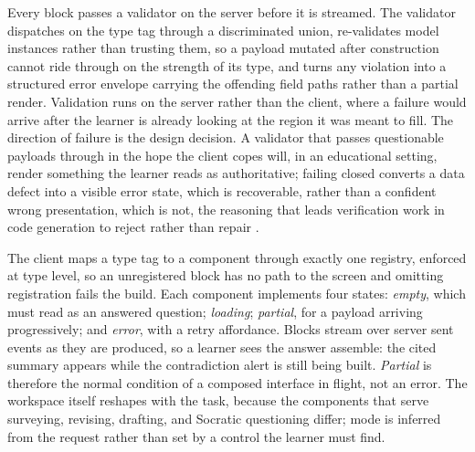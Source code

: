 \documentclass[conference]{IEEEtran}
\begin{document}
Every block passes a validator on the server before it is streamed. The validator dispatches on the type tag through a discriminated union, re-validates model instances rather than trusting them, so a payload mutated after construction cannot ride through on the strength of its type, and turns any violation into a structured error envelope carrying the offending field paths rather than a partial render. Validation runs on the server rather than the client, where a failure would arrive after the learner is already looking at the region it was meant to fill. The direction of failure is the design decision. A validator that passes questionable payloads through in the hope the client copes will, in an educational setting, render something the learner reads as authoritative; failing closed converts a data defect into a visible error state, which is recoverable, rather than a confident wrong presentation, which is not, the reasoning that leads verification work in code generation to reject rather than repair \cite{ref:probe}.

The client maps a type tag to a component through exactly one registry, enforced at type level, so an unregistered block has no path to the screen and omitting registration fails the build. Each component implements four states: \emph{empty}, which must read as an answered question; \emph{loading}; \emph{partial}, for a payload arriving progressively; and \emph{error}, with a retry affordance. Blocks stream over server sent events as they are produced, so a learner sees the answer assemble: the cited summary appears while the contradiction alert is still being built. \emph{Partial} is therefore the normal condition of a composed interface in flight, not an error. The workspace itself reshapes with the task, because the components that serve surveying, revising, drafting, and Socratic questioning differ; mode is inferred from the request rather than set by a control the learner must find.
\end{document}
